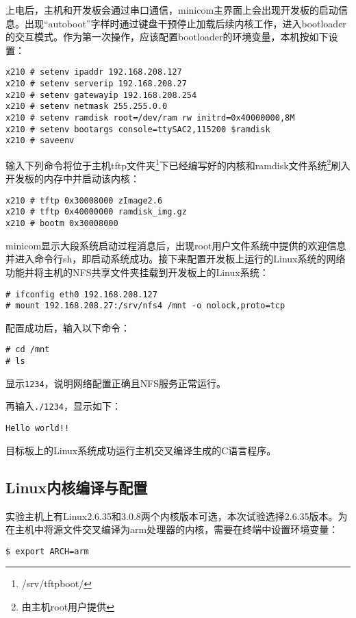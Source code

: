 \documentclass[hyperref,UTF8]{ctexart}
\begin{document}
上电后，主机和开发板会通过串口通信，minicom主界面上会出现开发板的启动信息。出现“autoboot”字样时通过键盘干预停止加载后续内核工作，进入bootloader的交互模式。作为第一次操作，应该配置bootloader的环境变量，本机按如下设置：
\begin{Verbatim}[frame=single]
x210 # setenv ipaddr 192.168.208.127
x210 # setenv serverip 192.168.208.27
x210 # setenv gatewayip 192.168.208.254
x210 # setenv netmask 255.255.0.0
x210 # setenv ramdisk root=/dev/ram rw initrd=0x40000000,8M
x210 # setenv bootargs console=ttySAC2,115200 $ramdisk
x210 # saveenv
\end{Verbatim}

输入下列命令将位于主机tftp文件夹\footnote{/srv/tftpboot/}下已经编写好的内核和ramdisk文件系统\footnote{由主机root用户提供}刷入开发板的内存中并启动该内核：\label{para:boot-test}
\begin{Verbatim}[frame=single]
x210 # tftp 0x30008000 zImage2.6
x210 # tftp 0x40000000 ramdisk_img.gz
x210 # bootm 0x30008000
\end{Verbatim}

minicom显示大段系统启动过程消息后，出现root用户文件系统中提供的欢迎信息并进入命令行sh，即启动系统成功。接下来配置开发板上运行的Linux系统的网络功能并将主机的NFS共享文件夹挂载到开发板上的Linux系统：
\begin{Verbatim}[frame=single]
# ifconfig eth0 192.168.208.127
# mount 192.168.208.27:/srv/nfs4 /mnt -o nolock,proto=tcp
\end{Verbatim}

配置成功后，输入以下命令：
\begin{Verbatim}[frame=single]
# cd /mnt
# ls
\end{Verbatim}
显示\verb"1234"，说明网络配置正确且NFS服务正常运行。

再输入\verb"./1234"，显示如下：
\begin{Verbatim}[frame=single]
Hello world!!
\end{Verbatim}
目标板上的Linux系统成功运行主机交叉编译生成的C语言程序。

\subsection{Linux内核编译与配置}\label{subsec:creat-kern}
实验主机上有Linux2.6.35和3.0.8两个内核版本可选，本次试验选择2.6.35版本。为在主机中将源文件交叉编译为arm处理器的内核，需要在终端中设置环境变量：\label{para:set-path}
\begin{Verbatim}[frame=single]
$ export ARCH=arm
\end{Verbatim}
\end{document}
